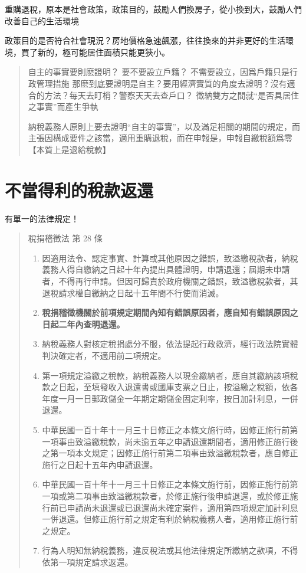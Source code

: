 \documentclass[]{ctexbook}
\begin{document}
重購退稅，原本是社會政策，政策目的，鼓勵人們換房子，從小換到大，鼓勵人們改善自己的生活環境

政策目的是否符合社會現況？房地價格急速飆漲，往往換來的并非更好的生活環境，買了新的，極可能居住面積只能更狹小。

\begin{quote}
自主的事實要則麽證明？
要不要設立戶籍？
不需要設立，因爲戶籍只是行政管理措施
那麽到底要證明是自主？要用經濟實質的角度去證明？沒有適合的方法？每天去盯梢？警察天天去查戶口？
徵納雙方之間就``是否具居住之事實''而產生爭執

納稅義務人原則上要去證明``自主的事實''，以及滿足相關的期間的規定，而主張因構成要件之該當，適用重購退稅，而在申報是，申報自繳稅額爲零【本質上是退給稅款】
\end{quote}

\hypertarget{ux4e0dux7576ux5f97ux5229ux7684ux7a05ux6b3eux8fd4ux9084}{%
\section{不當得利的稅款返還}\label{ux4e0dux7576ux5f97ux5229ux7684ux7a05ux6b3eux8fd4ux9084}}

有單一的法律規定！

\begin{quote}
稅捐稽徵法 第 28 條

\begin{enumerate}
\def\labelenumi{\arabic{enumi}.}
\item
  因適用法令、認定事實、計算或其他原因之錯誤，致溢繳稅款者，納稅義務人得自繳納之日起十年內提出具體證明，申請退還；屆期未申請者，不得再行申請。但因可歸責於政府機關之錯誤，致溢繳稅款者，其退稅請求權自繳納之日起十五年間不行使而消滅。
\item
  \textbf{稅捐稽徵機關於前項規定期間內知有錯誤原因者，應自知有錯誤原因之日起二年內查明退還。}
\item
  納稅義務人對核定稅捐處分不服，依法提起行政救濟，經行政法院實體判決確定者，不適用前二項規定。
\item
  第一項規定溢繳之稅款，納稅義務人以現金繳納者，應自其繳納該項稅款之日起，至填發收入退還書或國庫支票之日止，按溢繳之稅額，依各年度一月一日郵政儲金一年期定期儲金固定利率，按日加計利息，一併退還。
\item
  中華民國一百十年十一月三十日修正之本條文施行時，因修正施行前第一項事由致溢繳稅款，尚未逾五年之申請退還期間者，適用修正施行後之第一項本文規定；因修正施行前第二項事由致溢繳稅款者，應自修正施行之日起十五年內申請退還。
\item
  中華民國一百十年十一月三十日修正之本條文施行前，因修正施行前第一項或第二項事由致溢繳稅款者，於修正施行後申請退還，或於修正施行前已申請尚未退還或已退還尚未確定案件，適用第四項規定加計利息一併退還。但修正施行前之規定有利於納稅義務人者，適用修正施行前之規定。
\item
  行為人明知無納稅義務，違反稅法或其他法律規定所繳納之款項，不得依第一項規定請求返還。
\end{enumerate}
\end{quote}
\end{document}

